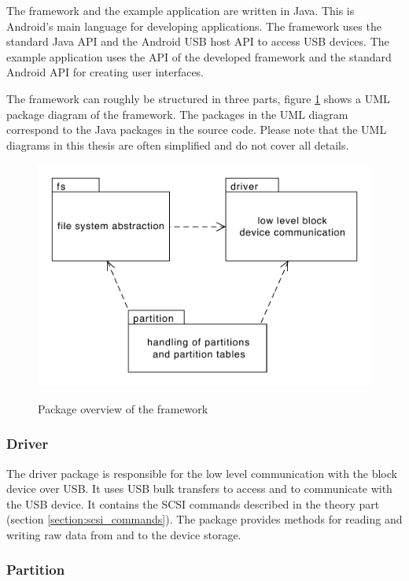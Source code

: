 The framework and the example application are written in Java. This is Android's main language for developing applications. The framework uses the standard Java API and the Android USB host API to access USB devices. The example application uses the API of the developed framework and the standard Android API for creating user interfaces.

The framework can roughly be structured in three parts, figure \ref{figure:package} shows a UML package diagram of the framework. The packages in the UML diagram correspond to the Java packages in the source code. Please note that the UML diagrams in this thesis are often simplified and do not cover all details.

\begin{figure}[h!]
\caption{Package overview of the framework}
\centering
\includegraphics[scale=0.9]{figures/package}
\label{figure:package}
\end{figure}

\subsubsection{Driver}

The driver package is responsible for the low level communication with the block device over USB. It uses USB bulk transfers to access and to communicate with the USB device. It contains the SCSI commands described in the theory part (section \ref{section:scsi_commands}). The package provides methods for reading and writing raw data from and to the device storage.

\subsubsection{Partition}

